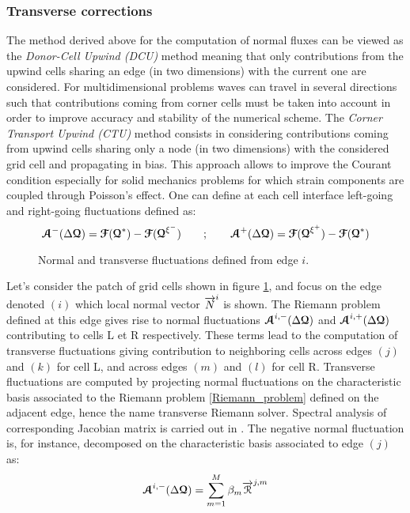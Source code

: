 \subsubsection*{Transverse corrections}
The method derived above for the computation of normal fluxes can be viewed as the \textit{Donor-Cell Upwind (DCU)} method \cite{Leveque} meaning that only contributions from the upwind cells sharing an edge (in two dimensions) with the current one are considered. For multidimensional problems waves can travel in several directions such that contributions coming from corner cells must be taken into account in order to improve accuracy and stability of the numerical scheme. The \textit{Corner Transport Upwind (CTU)} method \cite{Colella_CTU} consists in considering contributions coming from upwind cells sharing only a node (in two dimensions) with the considered grid cell and propagating in bias. This approach allows to improve the Courant condition especially for solid mechanics problems for which strain components are coupled through Poisson's effect. One can define at each cell interface left-going and right-going fluctuations defined as:
\begin{equation}
  {\boldsymbol{\mathcal{A}}}^-(\Delta {\boldsymbol{\mathcal{Q}}}) = {\boldsymbol{\mathcal{F}}}({\boldsymbol{\mathcal{Q}}}^*) - {\boldsymbol{\mathcal{F}}}({\boldsymbol{\mathcal{Q}}}^{\xi^-}) \qquad ;  \qquad {\boldsymbol{\mathcal{A}}}^+(\Delta {\boldsymbol{\mathcal{Q}}}) = {\boldsymbol{\mathcal{F}}}({\boldsymbol{\mathcal{Q}}}^{\xi^+})-{\boldsymbol{\mathcal{F}}}({\boldsymbol{\mathcal{Q}}}^*) 
\end{equation}
\begin{figure}[h!]
  \centering
  
  \caption{Normal and transverse fluctuations defined from edge $i$.}
  \label{fig:CTU}
\end{figure}
Let's consider the patch of grid cells shown in figure \ref{fig:CTU}, and focus on the edge denoted $(i)$ which local normal vector ${\overrightarrow{N}}^i$ is shown. The Riemann problem defined at this edge gives rise to normal fluctuations ${\boldsymbol{\mathcal{A}}}^{i,-}(\Delta {\boldsymbol{\mathcal{Q}}})$ and ${\boldsymbol{\mathcal{A}}}^{i,+}(\Delta {\boldsymbol{\mathcal{Q}}})$ contributing to cells L et R respectively. These terms lead to the computation of transverse fluctuations giving contribution to neighboring cells across edges $(j)$ and $(k)$ for cell L, and across edges $(m)$ and $(l)$ for cell R. Transverse fluctuations are computed by projecting normal fluctuations on the characteristic basis associated to the Riemann problem \eqref{Riemann_problem} defined on the adjacent edge, hence the name transverse Riemann solver. Spectral analysis of corresponding Jacobian matrix is carried out in \cite{Kluth}. The negative normal fluctuation is, for instance, decomposed on the characteristic basis associated to edge $(j)$ as:
\begin{equation}
{\boldsymbol{\mathcal{A}}}^{i,-}(\Delta {\boldsymbol{\mathcal{Q}}}) = \sum_{m=1}^{M} \beta_m {\overrightarrow{\mathcal{R}}}^{j,m}
\end{equation}
